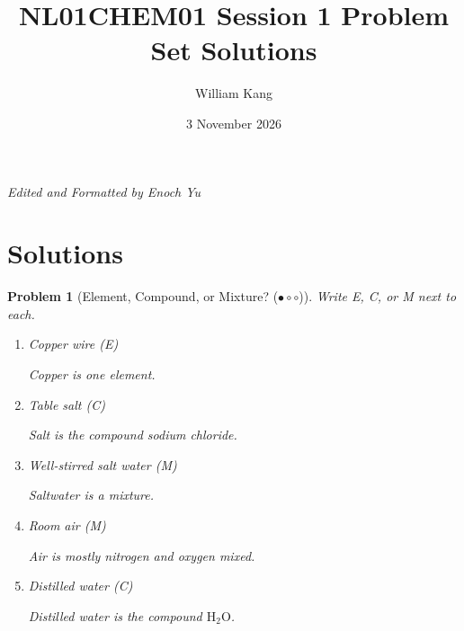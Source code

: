 \documentclass[a4paper,11pt]{article}
\title{\textbf{NL01CHEM01 Session 1 Problem Set Solutions}}
\date{3 November 2026}
\author{William Kang}
\newcommand{\easy}{(\ensuremath{\bullet \circ \circ})}
\theoremstyle{listprobstyle}
\newtheorem{problem}{Problem}
\newenvironment{solution}
    {\par\begingroup\color{BrickRed}}
    {\par\endgroup}
\begin{document}
\maketitle
\begin{center}
    \small\textit{Edited and Formatted by Enoch Yu}
\end{center}

\section{Solutions}
\begin{problem}[Element, Compound, or Mixture? \easy]
Write E, C, or M next to each.
\vspace{-0.6\baselineskip}
\begin{enumerate}[label=\alph*),itemsep=0pt,parsep=0pt,topsep=0pt]
\item Copper wire (\textcolor{BrickRed}{E})
\begin{solution}
Copper is one element.
\end{solution}
\vspace{0.5\baselineskip}

\item Table salt (\textcolor{BrickRed}{C})
\begin{solution}
Salt is the compound sodium chloride.
\end{solution}
\vspace{0.5\baselineskip}

\item Well-stirred salt water (\textcolor{BrickRed}{M})
\begin{solution}
Saltwater is a mixture.
\end{solution}
\vspace{0.5\baselineskip}

\item Room air (\textcolor{BrickRed}{M})
\begin{solution}
Air is mostly nitrogen and oxygen mixed.
\end{solution}
\vspace{0.5\baselineskip}

\item Distilled water (\textcolor{BrickRed}{C})
\begin{solution}
Distilled water is the compound $\mathrm{H_2O}$.
\end{solution}
\end{enumerate}
\end{problem}
\end{document}
